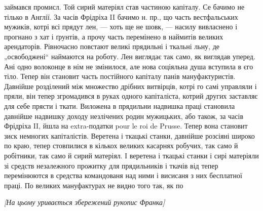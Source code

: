 займався промисл. Той сирий матеріял став частиною 
капіталу. Се бачимо не тілько в Англії. За часів
Фрідріха II бачимо н. пр., що часть вестфальських мужиків,
котрі всі прядут лен, — хоть ще не шовк, — насилу
вивласнено і прогнано з хат і ґрунтів, а прочу часть перемінено
в наймитів великих арендаторів. Рівночасно повстают
великі прядильні і ткальні льну, де „освободжені“ наймаются
на роботу. Лен виглядає так само, як виглядав уперед.
Ані одно волоконце в нім не змінилося, але нова соціяльна
душа вступила в єго тіло. Тепер він становит часть постійного
капіталу панів мануфактуристів. Давнійше розділений
між множество дрібних витвірців, котрі го самі управляли
і пряли, він тепер згромадився в руках одного капіталіста,
котрий других заставляє для себе прясти і ткати. Виложена
в прядильни надвишка праці становила давнійше надвишку
доходу незлічених родин мужицьких, або також, за часів
Фрідріха II, йшла на extra-податки pour le roi de Prusse.
Тепер вона становит зиск немногих капіталістів. Веретена
і ткацькі станки, давнійше розсіяні широко по краю, тепер
стовпилися в кількох великих касарнях робучих, так само
й робітники, так само й сирий матеріял. І веретена і ткацькі
станки і сирі матеріяли зі средств незалежного прожитку
для прядильників і ткачів від тепер перемінюются в средства
командованя над ними і висисаня з них бесплатної
праці. По великих мануфактурах не видно того так, як по
\linebreak[4]
\makebox[\linewidth]{\dotfill}
\centerline{\emph{[На цьому уривається збережений рукопис Франка]}}
